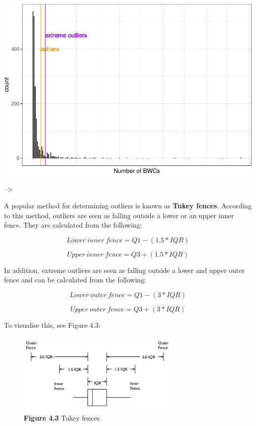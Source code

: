 \documentclass[
]{book}
\begin{document}
\includegraphics{04-descriptive-statistics_files/figure-latex/unnamed-chunk-30-1.pdf}

--\textgreater{}

A popular method for determining outliers is known as \textbf{Tukey fences}. According to this method, outliers are seen as falling outside a lower or an upper inner fence. They are calculated from the following:

\[ Lower~ inner~ fence = Q1 - (1.5*IQR)\]

\[ Upper~inner ~ fence = Q3 + (1.5 * IQR) \]

In addition, extreme outliers are seen as falling outside a lower and upper outer fence and can be calculated from the following:

\[ Lower~ outer ~fence = Q1 - (3 * IQR)\]

\[ Upper~ outer~ fence = Q3 + (3 * IQR) \]

To visualise this, see Figure 4.3:

\begin{figure}
\centering
\includegraphics[width=0.7\textwidth,height=\textheight]{Images/tukey.png}
\caption{\textbf{Figure 4.3} Tukey fences}
\end{figure}
\end{document}
